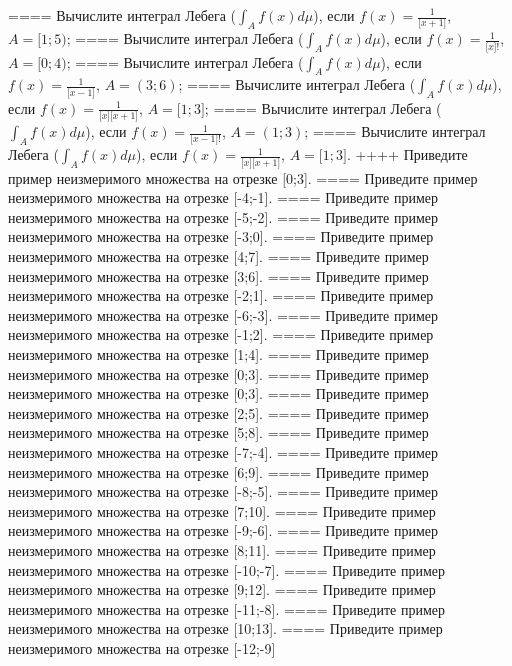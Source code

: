====
Вычислите интеграл Лебега (\(\int_{A}^{}{f(x)d\mu}\)), если \(f(x) = \frac{1}{\lbrack x + 1\rbrack}\), \(A = \lbrack 1;5)\);
====
Вычислите интеграл Лебега (\(\int_{A}^{}{f(x)d\mu}\)), если \(f(x) = \frac{1}{\lbrack x\rbrack!}\), \(A = \lbrack 0;4)\);
====
Вычислите интеграл Лебега (\(\int_{A}^{}{f(x)d\mu}\)), если \(f(x) = \frac{1}{\lbrack x - 1\rbrack}\), \(A = (3;6)\);
====
Вычислите интеграл Лебега (\(\int_{A}^{}{f(x)d\mu}\)), если \(f(x) = \frac{1}{\lbrack x\rbrack\lbrack x + 1\rbrack}\), \(A = \lbrack 1;3\rbrack\);
====
Вычислите интеграл Лебега (\(\int_{A}^{}{f(x)d\mu}\)), если \(f(x) = \frac{1}{\lbrack x - 1\rbrack!}\), \(A = (1;3)\);
====
Вычислите интеграл Лебега (\(\int_{A}^{}{f(x)d\mu}\)), если \(f(x) = \frac{1}{\lbrack x\rbrack\lbrack x + 1\rbrack}\), \(A = \lbrack 1;3\rbrack\).
++++
Приведите пример неизмеримого множества на отрезке [0;3].
====
Приведите пример неизмеримого множества на отрезке [-4;-1].
====
Приведите пример неизмеримого множества на отрезке [-5;-2].
====
Приведите пример неизмеримого множества на отрезке [-3;0].
====
Приведите пример неизмеримого множества на отрезке [4;7].
====
Приведите пример неизмеримого множества на отрезке [3;6].
====
Приведите пример неизмеримого множества на отрезке [-2;1].
====
Приведите пример неизмеримого множества на отрезке [-6;-3].
====
Приведите пример неизмеримого множества на отрезке [-1;2].
====
Приведите пример неизмеримого множества на отрезке [1;4].
====
Приведите пример неизмеримого множества на отрезке [0;3].
====
Приведите пример неизмеримого множества на отрезке [0;3].
====
Приведите пример неизмеримого множества на отрезке [2;5].
====
Приведите пример неизмеримого множества на отрезке [5;8].
====
Приведите пример неизмеримого множества на отрезке [-7;-4].
====
Приведите пример неизмеримого множества на отрезке [6;9].
====
Приведите пример неизмеримого множества на отрезке [-8;-5].
====
Приведите пример неизмеримого множества на отрезке [7;10].
====
Приведите пример неизмеримого множества на отрезке [-9;-6].
====
Приведите пример неизмеримого множества на отрезке [8;11].
====
Приведите пример неизмеримого множества на отрезке [-10;-7].
====
Приведите пример неизмеримого множества на отрезке [9;12].
====
Приведите пример неизмеримого множества на отрезке [-11;-8].
====
Приведите пример неизмеримого множества на отрезке [10;13].
====
Приведите пример неизмеримого множества на отрезке [-12;-9]
